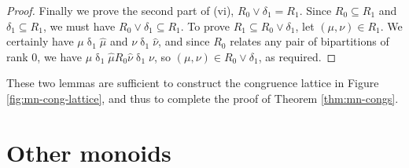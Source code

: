 \begin{lemma}
\begin{proof}
    Finally we prove the second part of (vi), $R_0 \vee \delta_1 = R_1$.  Since
    $R_0 \subseteq R_1$ and $\delta_1 \subseteq R_1$, we must have
    $R_0 \vee \delta_1 \subseteq R_1$.  To prove
    $R_1 \subseteq R_0 \vee \delta_1$, let $(\mu, \nu) \in R_1$.  We certainly
    have $\mu \mathrel\delta_1 \widehat\mu$ and
    $\nu \mathrel\delta_1 \widehat\nu$, and since $R_0$ relates any pair of
    bipartitions of rank $0$, we have
    $\mu \mathrel\delta_1 \widehat\mu \mathrel{R_0} \widehat\nu \mathrel\delta_1
    \nu$, so $(\mu, \nu) \in R_0 \vee \delta_1$, as required.
  \end{proof}
\end{lemma}

These two lemmas are sufficient to construct the congruence lattice in Figure
\ref{fig:mn-cong-lattice}, and thus to complete the proof of Theorem
\ref{thm:mn-congs}.

\section{Other monoids}
\label{sec:motzkin-other}

